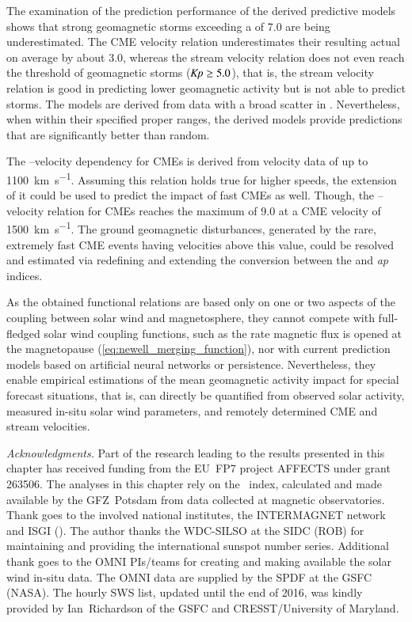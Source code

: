 The examination of the prediction performance of the derived predictive models shows that strong geomagnetic storms exceeding a \Kp{} of 7.0 are being underestimated. The CME velocity relation underestimates their resulting actual \Kp{} on average by about 3.0, whereas the stream velocity relation does not even reach the threshold of geomagnetic storms ($\text{\textit{Kp}} \geq 5.0$), that is, the stream velocity relation is good in predicting lower geomagnetic activity but is not able to predict storms.
The models are derived from data with a broad scatter in \Kp{}. Nevertheless, when within their specified proper ranges, the derived models provide predictions that are significantly better than random.

The \Kp--velocity dependency for CMEs is derived from velocity data of up to \SI{1100}{\km\per\s}. Assuming this relation holds true for higher speeds, the extension of it could be used to predict the \Kp{} impact of fast CMEs as well. Though, the \Kp--velocity relation for CMEs reaches the maximum \Kp{} of 9.0 at a CME velocity of \SI{1500}{\km\per\s}. The ground geomagnetic disturbances, generated by the rare, extremely fast CME events having velocities above this value, could be resolved and estimated via redefining and extending the conversion between the \Kp{} and \textit{ap} indices.

As the obtained functional relations are based only on one or two aspects of the coupling between solar wind and magnetosphere, they cannot compete with full-fledged solar wind coupling functions, such as the rate magnetic flux is opened at the magnetopause (\autoref{eq:newell_merging_function}), nor with current prediction models based on artificial neural networks or \Kp{} persistence. Nevertheless, they enable empirical estimations of the mean geomagnetic activity impact for special forecast situations, that is, \Kp{} can directly be quantified from observed solar activity, measured in-situ solar wind parameters, and remotely determined CME and stream velocities.



\bigskip
{\small
\noindent \textit{Acknowledgments.} Part of the research leading to the results presented in this chapter has received funding from the EU~FP7 project AFFECTS under grant 263506.
The analyses in this chapter rely on the \Kp~index, calculated and made available by the GFZ~Potsdam from data collected at magnetic observatories. Thank goes to the involved national institutes, the INTERMAGNET network and ISGI (). The author thanks the WDC-SILSO at the SIDC (ROB) for maintaining and providing the international sunspot number series. Additional thank goes to the OMNI PIs/teams for creating and making available the solar wind in-situ data. The OMNI data are supplied by the SPDF at the GSFC (NASA). The hourly SWS list, updated until the end of 2016, was kindly provided by Ian~Richardson of the GSFC and CRESST/University of Maryland.
}

